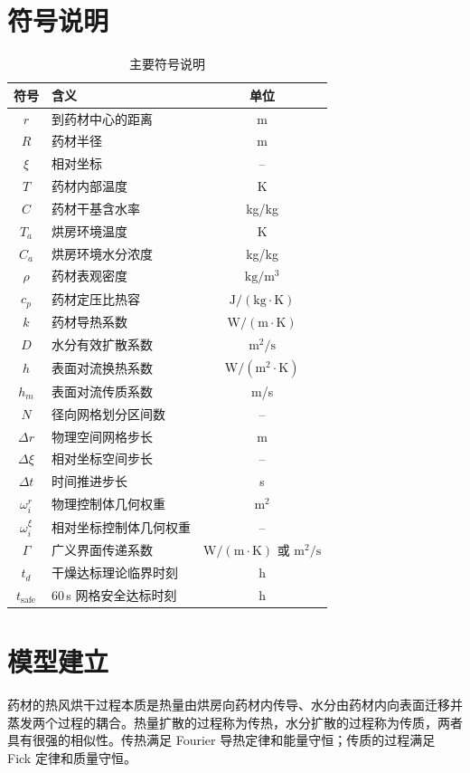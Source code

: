 \documentclass[12pt,a4paper,fontset=none]{ctexart}
\begin{document}
\section{符号说明}
\begin{table}[H]
\centering
\caption{主要符号说明}\label{tab:symbols}
\small
\renewcommand{\arraystretch}{1.1}
\begin{tabularx}{0.92\textwidth}{c<{\centering}X<{\raggedright}c<{\centering}}
\toprule
符号 & 含义 & 单位\\
\midrule
$r$ & 到药材中心的距离 & m\\
$R$ & 药材半径 & m\\
$\xi$ & 相对坐标 & --\\
$T$ & 药材内部温度 & K\\
$C$ & 药材干基含水率 & kg/kg\\
$T_a$ & 烘房环境温度 & K\\
$C_a$ & 烘房环境水分浓度 & kg/kg\\
$\rho$ & 药材表观密度 & $\mathrm{kg/m^3}$\\
$c_p$ & 药材定压比热容 & $\mathrm{J/(kg\cdot K)}$\\
$k$ & 药材导热系数 & $\mathrm{W/(m\cdot K)}$\\
$D$ & 水分有效扩散系数 & $\mathrm{m^2/s}$\\
$h$ & 表面对流换热系数 & $\mathrm{W/(m^2\cdot K)}$\\
$h_m$ & 表面对流传质系数 & m/s\\
$N$ & 径向网格划分区间数 & --\\
$\Delta r$ & 物理空间网格步长 & m\\
$\Delta\xi$ & 相对坐标空间步长 & --\\
$\Delta t$ & 时间推进步长 & s\\
$\omega_i^r$ & 物理控制体几何权重 & $\mathrm{m^2}$\\
$\omega_i^\xi$ & 相对坐标控制体几何权重 & --\\
$\Gamma$ & 广义界面传递系数 & $\mathrm{W/(m\cdot K)}$ 或 $\mathrm{m^2/s}$\\
$t_d$ & 干燥达标理论临界时刻 & h\\
$t_{\mathrm{safe}}$ & 60\,s 网格安全达标时刻 & h\\
\bottomrule
\end{tabularx}
\end{table}

\section{模型建立}
药材的热风烘干过程本质是热量由烘房向药材内传导、水分由药材内向表面迁移并蒸发两个过程的耦合。热量扩散的过程称为传热，水分扩散的过程称为传质，两者具有很强的相似性。传热满足 Fourier 导热定律和能量守恒；传质的过程满足 Fick 定律和质量守恒。
\end{document}
